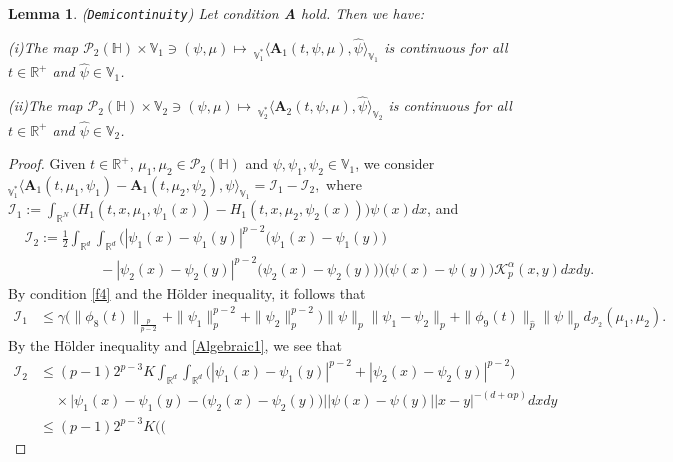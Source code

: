 \documentclass[11pt]{article}
\renewcommand{\leq}{\leqslant}
\newtheorem{lemma}[theorem]{Lemma}
\numberwithin{equation}{section}
\begin{document}
\begin{lemma}(\texttt{Demicontinuity})
\label{Demicontinuity}
Let condition \textbf{A} hold. Then we have:

(i)The map $ \mathcal{P}_2
(\mathbb{H})\times \mathbb{V}_1 \ni(\psi, \mu )\mapsto\
_{\mathbb{V}^*_1}\big\langle \mathbf{A}_1(t,\psi, \mu) ,\widehat{\psi}\big\rangle_{\mathbb{V}_1}$ is continuous
for all $t\in\mathbb{R}^+$ and
$\widehat{\psi}\in \mathbb{V}_1$.

(ii)The map $\mathcal{P}_2
(\mathbb{H})\times \mathbb{V}_2\ni(\psi, \mu)\mapsto\
_{\mathbb{V}^*_2}\big\langle \mathbf{A}_2(t,\psi, \mu) ,\widehat{\psi}\big\rangle_{\mathbb{V}_2}$ is continuous
for all $t\in\mathbb{R}^+$ and
$\widehat{\psi}\in \mathbb{V}_2$.
\end{lemma}
\begin{proof}
Given $t\in\mathbb{R}^+$,
$\mu_1,\mu_2\in\mathcal{P}_2
(\mathbb{H})$ and
$\psi,\psi_1,\psi_2\in \mathbb{V}_1$, we
consider
$_{\mathbb{V}_1^*}\big\langle \mathbf{A}_1(t,\mu_1,\psi_1)-
\mathbf{A}_1(t,\mu_2,\psi_2) ,\psi\big\rangle_{\mathbb{V}_1}
=\mathcal{I}_1 -\mathcal{I}_2,$
where $\mathcal{I}_1:=\int_{\mathbb{R}^N}
\big(H_1(t,x,\mu_1,\psi_1(x))-
H_1(t,x,\mu_2,\psi_2(x))\big)\psi(x)dx$, and
 \begin{align*}&
\mathcal{I}_2:=\frac{1}{2}
\int_{\mathbb{R}^d}  \int_{\mathbb{R}^d}
\Big(|\psi_1(x)-\psi_1(y)|^{p-2}\big
(\psi_1(x)-\psi_1(y)\big) \\&\ \ \ \ \ \  \ \ \ \ \ \  \ \ \  \ \ \ \ \ \  \ \ \ -|\psi_2(x)-\psi_2(y)|^{p-2}\big
(\psi_2(x)-\psi_2(y)\big)     \Big)
 \big( \psi(x)-\psi(y)\big)
 \mathcal{K}_{p}^\alpha(x,y)
dxdy.
 \end{align*}
By condition \eqref{f4} and the H\"{o}lder
inequality, it follows that
 \begin{align*}
\mathcal{I}_1&\leq\gamma
\Big(\|\phi_8(t) \|_{\frac{p}{p-2}} +\|\psi_1 \|^{p-2}_{p} +\|\psi_2 \|^{p-2}_{p}        \Big)
\|\psi
\|_{p} \|\psi_1
-\psi_2\|_{p}
+\|\phi_9(t) \|_{\widehat{p}}  \|\psi
\|_{p}
d_{\mathcal{P}_2}
(\mu_1,\mu_2).
 \end{align*}
By the H\"{o}lder
inequality and \eqref{Algebraic1}, we see that
\begin{align*}
\mathcal{I}_2&\leq(p-1)2^{p-3}K\int_{\mathbb{R}^d}  \int_{\mathbb{R}^d}\big(|\psi_1(x)-\psi_1(y)|^{p-2}
+|\psi_2(x)-\psi_2(y)|^{p-2}\big)
\\& \ \ \  \ \ \times\big|\psi_1(x)-\psi_1(y)-
\big(\psi_2(x)-\psi_2(y)\big)\big| |\psi(x)-\psi(y)|
|x-y|^{-(d+\alpha p)}dxdy
\\&\leq(p-1)2^{p-3}K\Bigg(\bigg(

\end{align*}
\end{proof}
\end{document}
